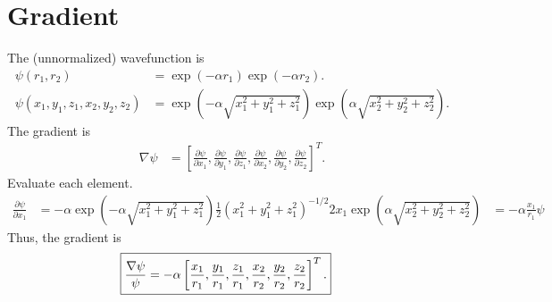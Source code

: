 \section{Gradient}
The (unnormalized) wavefunction is 
\begin{align}
\psi(r_1, r_2) &= \exp(-\alpha r_1) \exp(-\alpha r_2). \\
\psi(x_1, y_1, z_1, x_2, y_2, z_2) &= \exp \left(-\alpha \sqrt{x_1^2 + y_1^2 + z_1^2}\right) \exp \left(\alpha \sqrt{x_2^2 + y_2^2 + z_2^2} \right).
\end{align}
The gradient is
\begin{align}
\nabla \psi &= \left[
\frac{\partial \psi}{\partial x_1}, 
\frac{\partial \psi}{\partial y_1}, 
\frac{\partial \psi}{\partial z_1},
\frac{\partial \psi}{\partial x_2},
\frac{\partial \psi}{\partial y_2},
\frac{\partial \psi}{\partial z_2}
\right]^T.
\end{align}
Evaluate each element.
\begin{align}
\frac{\partial \psi}{\partial x_1} &= -\alpha \exp \left(-\alpha \sqrt{x_1^2 + y_1^2 + z_1^2}\right) \frac{1}{2} (x_1^2 + y_1^2 + z_1^2)^{-1/2} 2x_1 \exp \left(\alpha \sqrt{x_2^2 + y_2^2 + z_2^2} \right)
&= -\alpha \frac{x_1}{r_1} \psi
\end{align}
Thus, the gradient is 
\begin{align}
\Aboxed{\frac{\nabla \psi}{\psi} &= -\alpha \left[\frac{x_1}{r_1}, \frac{y_1}{r_1}, \frac{z_1}{r_1}, \frac{x_2}{r_2}, \frac{y_2}{r_2}, \frac{z_2}{r_2} \right]^T.}
\end{align}

